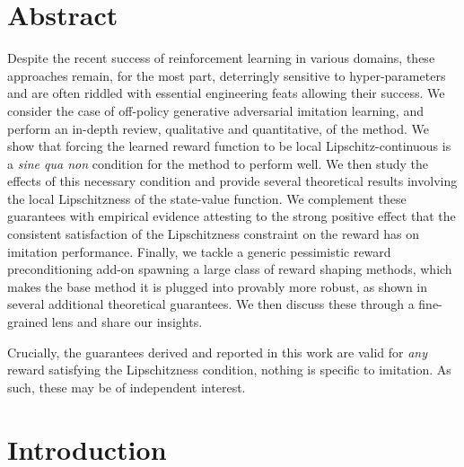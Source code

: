 

\section*{Abstract}

Despite the recent success of reinforcement learning in various domains,
these approaches remain, for the most part, deterringly sensitive to hyper-parameters
and are often riddled with essential engineering feats allowing their success.
We consider the case of off-policy generative adversarial imitation learning,
and perform an in-depth review, qualitative and quantitative, of the method.
We show that forcing the learned reward function to be local Lipschitz-continuous
is a \textit{sine qua non} condition for the method to perform well.
We then study the effects of this necessary condition and provide several theoretical results
involving the local Lipschitzness of the state-value function.
We complement these guarantees with empirical evidence attesting to the strong
positive effect that the consistent satisfaction of the Lipschitzness constraint on the reward has
on imitation performance.
Finally, we tackle a generic pessimistic reward preconditioning add-on
spawning a large class of reward shaping methods, which
makes the base method it is plugged into provably more robust, as shown in several
additional theoretical guarantees.
We then discuss these through a fine-grained lens and share our insights.

Crucially, the guarantees derived and
reported in this work are valid for \emph{any} reward
satisfying the Lipschitzness condition, nothing is specific to imitation.
As such, these may be of independent interest.

\section{Introduction}


